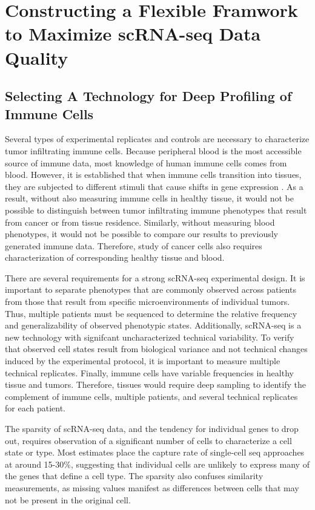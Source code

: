 \chapter[Constructing a Flexible Framwork to Maximize scRNA-seq Data Quality][Constructing a Flexible Framwork to Maximize scRNA-seq Data Quality]{Constructing a Flexible Framwork to Maximize scRNA-seq Data Quality}

\section{Selecting A Technology for Deep Profiling of Immune Cells}

Several types of experimental replicates and controls are necessary to characterize tumor infiltrating immune cells. 
Because peripheral blood is the most accessible source of immune data, most knowledge of human immune cells comes from blood. 
However, it is established that when immune cells transition into tissues, they are subjected to different stimuli that cause shifts in gene expression \citep{Fan2016}. 
As a result, without also measuring immune cells in healthy tissue, it would not be possible to distinguish between tumor infiltrating immune phenotypes that result from cancer or from tissue residence. 
Similarly, without measuring blood phenotypes, it would not be possible to compare our results to previously generated immune data. 
Therefore, study of cancer cells also requires characterization of corresponding healthy tissue and blood.

There are several requirements for a strong scRNA-seq experimental design. 
It is important to separate phenotypes that are commonly observed across patients from those that result from specific microenvironments of individual tumors. 
Thus, multiple patients must be sequenced to determine the relative frequency and generalizability of observed phenotypic states. 
Additionally, scRNA-seq is a new technology with signifcant uncharacterized technical variability. 
To verify that observed cell states result from biological variance and not technical changes induced by the experimental protocol, it is important to measure multiple technical replicates. 
Finally, immune cells have variable frequencies in healthy tissue and tumors.  %
Therefore, tissues would require deep sampling to identify the complement of immune cells, multiple patients, and several technical replicates for each patient.  

The sparsity of scRNA-seq data, and the tendency for individual genes to drop out, requires observation of a significant number of cells to characterize a cell state or type. 
Most estimates place the capture rate of single-cell seq approaches at around 15-30\%, suggesting that individual cells are unlikely to express many of the genes that define a cell type. 
The sparsity also confuses similarity measurements, as missing values manifest as differences between cells that may not be present in the original cell. 

